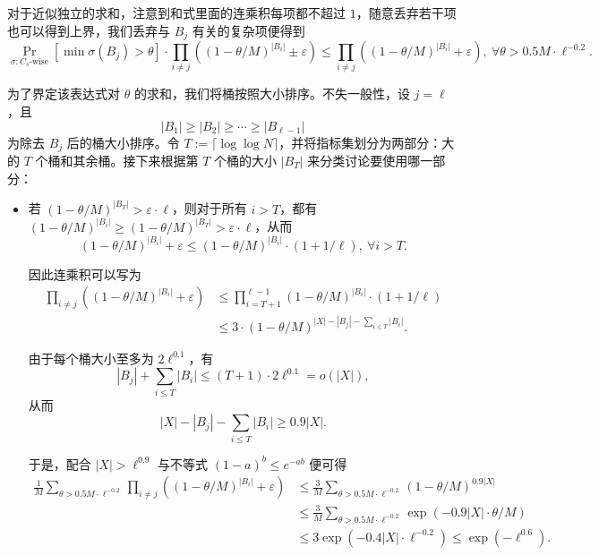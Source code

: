 对于近似独立的求和，注意到和式里面的连乘积每项都不超过 $1$，随意丢弃若干项也可以得到上界，我们丢弃与 $B_j$ 有关的复杂项便得到
$$
\Pr_{\sigma : C_s\text{-wise}}[\min \sigma(B_j) > \theta] \cdot \prod_{i \ne j} \left( (1 - \theta / M)^{|B_i|} \pm \varepsilon \right) \le \prod_{i \ne j} \left( (1 - \theta / M)^{|B_i|} + \varepsilon \right),\ \forall \theta > 0.5 M \cdot \ell^{-0.2}.
$$

为了界定该表达式对 $\theta$ 的求和，我们将桶按照大小排序。不失一般性，设 $j = \ell$，且
$$
|B_1| \ge |B_2| \ge \cdots \ge |B_{\ell-1}|
$$
为除去 $B_j$ 后的桶大小排序。令 $T := \lceil \log \log N \rceil$，并将指标集划分为两部分：大的 $T$ 个桶和其余桶。接下来根据第 $T$ 个桶的大小 $|B_T|$ 来分类讨论要使用哪一部分：

\begin{itemize}
    \item 若 $(1 - \theta / M)^{|B_T|} > \varepsilon \cdot \ell$，则对于所有 $i > T$，都有 $(1 - \theta / M)^{|B_i|} \ge (1 - \theta / M)^{|B_T|} > \varepsilon \cdot \ell$，从而
    $$
    (1 - \theta / M)^{|B_i|} + \varepsilon 
    \le (1 - \theta / M)^{|B_i|} \cdot (1 + 1/\ell),\ \forall i > T.
    $$

    因此连乘积可以写为
    \begin{align*}
        \prod_{i \ne j} \left( (1 - \theta / M)^{|B_i|} + \varepsilon \right) & \le \prod_{i = T + 1}^{\ell - 1} (1 - \theta / M)^{|B_i|} \cdot (1 + 1 / \ell) \\
          & \le 3 \cdot (1 - \theta / M)^{|X| - |B_j| - \sum_{i \le T} |B_i|}.
    \end{align*}

    由于每个桶大小至多为 $2 \ell^{0.1}$，有
    $$
    |B_j| + \sum_{i \le T} |B_i| \le (T + 1) \cdot 2 \ell^{0.1} = o(|X|),
    $$
    从而
    $$
    |X| - |B_j| - \sum_{i \le T} |B_i| \ge 0.9 |X|.
    $$

    于是，配合 $|X| > \ell^{0.9}$ 与不等式 $(1 - a)^b \le e^{-a b}$ 便可得
    \begin{align*}
        \frac{1}{M} \sum_{\theta > 0.5 M \cdot \ell^{-0.2}} 
        \prod_{i \ne j} \left( (1 - \theta / M)^{|B_i|} + \varepsilon \right) & \le \frac{3}{M} \sum_{\theta > 0.5 M \cdot \ell^{-0.2}} (1 - \theta / M)^{0.9 |X|} \\
          & \le \frac{3}{M} \sum_{\theta > 0.5 M \cdot \ell^{-0.2}} \exp(-0.9 |X| \cdot \theta / M) \\
          & \le 3 \exp(-0.4 |X| \cdot \ell^{-0.2}) \le \exp(-\ell^{0.6}).
    \end{align*}


\end{itemize}
